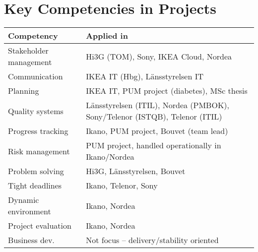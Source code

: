 \section{Key Competencies in Projects}
{\small\ttfamily
\begin{tabular}{p{5cm} p{9cm}}
\textbf{Competency} & \textbf{Applied in} \\ \hline
Stakeholder management & Hi3G (TOM), Sony, IKEA Cloud, Nordea \\
Communication & IKEA IT (Hbg), Länsstyrelsen IT \\
Planning & IKEA IT, PUM project (diabetes), MSc thesis \\
Quality systems & Länsstyrelsen (ITIL), Nordea (PMBOK), Sony/Telenor (ISTQB), Telenor (ITIL) \\
Progress tracking & Ikano, PUM project, Bouvet (team lead) \\
Risk management & PUM project, handled operationally in Ikano/Nordea \\
Problem solving & Hi3G, Länsstyrelsen, Bouvet \\
Tight deadlines & Ikano, Telenor, Sony \\
Dynamic environment & Ikano, Nordea \\
Project evaluation & Ikano, Nordea \\
Business dev. & Not focus – delivery/stability oriented \\
\end{tabular}
}
\normalsize
